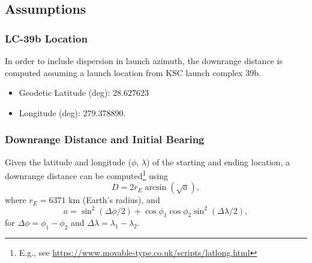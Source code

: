 \documentclass{hitec}
\begin{document}
\subsection{Assumptions}\label{ssec:Assumptions}



\subsubsection{LC-39b Location}
In order to include dispersion in launch azimuth, the downrange distance is computed assuming a launch location from KSC launch complex 39b.
\begin{itemize}
	\item Geodetic Latitude (deg): $28.627623$
	\item Longitude (deg): $279.378890$.
\end{itemize}

\subsubsection{Downrange Distance and Initial Bearing}
Given the latitude and longitude ($\phi$, $\lambda$) of the starting and ending location, a downrange distance can be computed\footnote{E.g., see \url{https://www.movable-type.co.uk/scripts/latlong.html}} using
\begin{equation}
	D = 2r_E\arcsin(\sqrt{a}),
\end{equation}
where $r_E = 6371$ km (Earth's radius), and
\begin{equation}
	a = \sin^2(\Delta\phi/2) + \cos\phi_1\cos\phi_2\sin^2(\Delta\lambda/2),
\end{equation}
for $\Delta\phi = \phi_1-\phi_2$ and $\Delta\lambda = \lambda_1-\lambda_2$.
\end{document}
